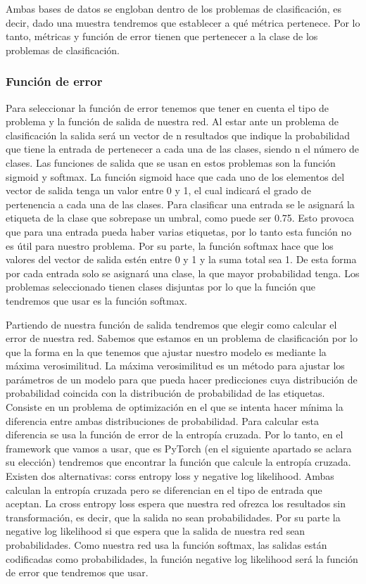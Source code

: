 Ambas bases de datos se engloban dentro de los problemas de clasificación, es decir, dado una muestra tendremos que establecer a qué métrica pertenece. Por lo tanto, métricas y función de error tienen que pertenecer a la clase de los problemas de clasificación. 

\subsubsection{Función de error}

Para seleccionar la función de error tenemos que tener en cuenta el tipo de problema y la función de salida de nuestra red. Al estar ante un problema de clasificación la salida será un vector de n resultados que indique la probabilidad que tiene la entrada de pertenecer a cada una de las clases, siendo n el número de clases. Las funciones de salida que se usan en estos problemas son la función sigmoid y softmax. La función sigmoid hace que cada uno de los elementos del vector de salida tenga un valor entre 0 y 1, el cual indicará el grado de pertenencia a cada una de las clases. Para clasificar una entrada se le asignará la etiqueta de la clase que sobrepase un umbral, como puede ser 0.75. Esto provoca que para una entrada pueda haber varias etiquetas, por lo tanto esta función no es útil para nuestro problema. Por su parte, la función softmax hace que los valores del vector de salida estén entre 0 y 1 y la suma total sea 1. De esta forma por cada entrada solo se asignará una clase, la que mayor probabilidad tenga. Los problemas seleccionado tienen clases disjuntas por lo que la función que tendremos que usar es la función softmax.  

Partiendo de nuestra función de salida tendremos que elegir como calcular el error de nuestra red. Sabemos que estamos en un problema de clasificación por lo que la forma en la que tenemos que ajustar nuestro modelo es mediante la máxima verosimilitud. La máxima verosimilitud es un método para ajustar los parámetros de un modelo para que pueda hacer predicciones cuya distribución de probabilidad coincida con la distribución de probabilidad de las etiquetas. Consiste en un problema de optimización en el que se intenta hacer mínima la diferencia entre ambas distribuciones de probabilidad. Para calcular esta diferencia se usa la función de error de la entropía cruzada. Por lo tanto, en el framework que vamos a usar, que es PyTorch (en el siguiente apartado se aclara su elección) tendremos que encontrar la función que calcule la entropía cruzada. Existen dos alternativas: corss entropy loss y negative log likelihood. Ambas calculan la entropía cruzada pero se diferencian en el tipo de entrada que aceptan. La cross entropy loss espera que nuestra red ofrezca los resultados sin transformación, es decir, que la salida no sean probabilidades. Por su parte la negative log likelihood si que espera que la salida de nuestra red sean probabilidades. Como nuestra red usa la función softmax, las salidas están codificadas como probabilidades, la función negative log likelihood será la función de error que tendremos que usar.


